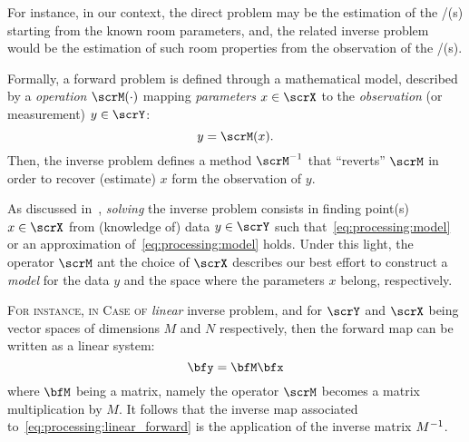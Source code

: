 For instance, in our context, the direct problem may be the estimation of the \RIR/(s) starting from the known room parameters,
and, the related inverse problem would be the estimation of such room properties from the observation of the \RIR/(s).

Formally, a forward problem is defined through a mathematical model, described by a \textit{operation} $\scrM(\cdot)$
mapping \textit{parameters} $x \in \scrX$ to the \textit{observation} (or measurement) $y \in \scrY$:
\begin{equation}\label{eq:processing:model}
    y = \scrM(x)
    .
\end{equation}
Then, the inverse problem defines a method $\kinv{\scrM}$ that ``reverts'' $\scrM$ in order to recover (estimate) $x$ form the observation of $y$.

As discussed in~\cite{bal2012introduction}, \textit{solving} the inverse problem consists in finding point(s) $x \in \scrX$ from (knowledge of) data $y \in \scrY$
such that~\cref{eq:processing:model} or an approximation of~\cref{eq:processing:model} holds.
Under this light, the operator $\scrM$ ant the choice of $\scrX$ describes our best effort to construct a \textit{model} for the data $y$ and
the space where the parameters $x$ belong, respectively.

\textsc{For instance, in Case of} \textit{linear} inverse problem, and for $\scrY$ and $\scrX$ being vector spaces of dimensions $M$ and $N$ respectively,
then the forward map can be written as a linear system:
\begin{equation}\label{eq:processing:linear_forward}
    \bfy = \bfM \bfx
\end{equation}
where $\bfM$ being a matrix, namely the operator $\scrM$ becomes a matrix multiplication by $M$.
It follows that the inverse map associated to~\cref{eq:processing:linear_forward} is the application of the inverse matrix ${M}^{-1}$.

